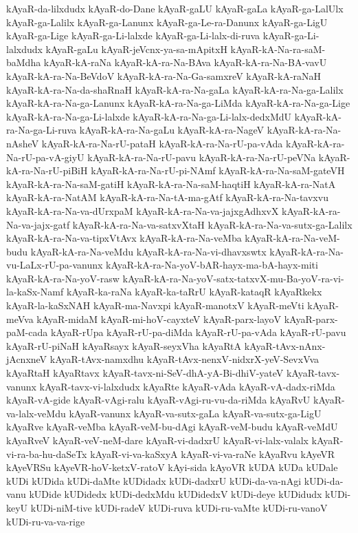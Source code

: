 {kAyaR-da-lilxdudx
kAyaR-do-Dane
kAyaR-gaLU
kAyaR-gaLa
kAyaR-ga-LalUlx
kAyaR-ga-Lalilx
kAyaR-ga-Lanunx
kAyaR-ga-Le-ra-Danunx
kAyaR-ga-LigU
kAyaR-ga-Lige
kAyaR-ga-Li-lalxde
kAyaR-ga-Li-lalx-di-ruva
kAyaR-ga-Li-lalxdudx
kAyaR-gaLu
kAyaR-jeVcnx-ya-sa-mApitxH
kAyaR-kA-Na-ra-saM-baMdha
kAyaR-kA-raNa
kAyaR-kA-ra-Na-BAva
kAyaR-kA-ra-Na-BA-vavU
kAyaR-kA-ra-Na-BeVdoV
kAyaR-kA-ra-Na-Ga-samxreV
kAyaR-kA-raNaH
kAyaR-kA-ra-Na-da-shaRnaH
kAyaR-kA-ra-Na-gaLa
kAyaR-kA-ra-Na-ga-Lalilx
kAyaR-kA-ra-Na-ga-Lanunx
kAyaR-kA-ra-Na-ga-LiMda
kAyaR-kA-ra-Na-ga-Lige
kAyaR-kA-ra-Na-ga-Li-lalxde
kAyaR-kA-ra-Na-ga-Li-lalx-dedxMdU
kAyaR-kA-ra-Na-ga-Li-ruva
kAyaR-kA-ra-Na-gaLu
kAyaR-kA-ra-NageV
kAyaR-kA-ra-Na-nAsheV
kAyaR-kA-ra-Na-rU-pataH
kAyaR-kA-ra-Na-rU-pa-vAda
kAyaR-kA-ra-Na-rU-pa-vA-giyU
kAyaR-kA-ra-Na-rU-pavu
kAyaR-kA-ra-Na-rU-peVNa
kAyaR-kA-ra-Na-rU-piBiH
kAyaR-kA-ra-Na-rU-pi-NAmf
kAyaR-kA-ra-Na-saM-gateVH
kAyaR-kA-ra-Na-saM-gatiH
kAyaR-kA-ra-Na-saM-haqtiH
kAyaR-kA-ra-NatA
kAyaR-kA-ra-NatAM
kAyaR-kA-ra-Na-tA-ma-gAtf
kAyaR-kA-ra-Na-tavxvu
kAyaR-kA-ra-Na-va-dUrxpaM
kAyaR-kA-ra-Na-va-jajxgAdhxvX
kAyaR-kA-ra-Na-va-jajx-gatf
kAyaR-kA-ra-Na-va-satxvXtaH
kAyaR-kA-ra-Na-va-sutx-ga-Lalilx
kAyaR-kA-ra-Na-va-tipxVtAvx
kAyaR-kA-ra-Na-veMba
kAyaR-kA-ra-Na-veM-budu
kAyaR-kA-ra-Na-veMdu
kAyaR-kA-ra-Na-vi-dhavxswtx
kAyaR-kA-ra-Na-vu-LaLx-rU-pa-vanunx
kAyaR-kA-ra-Na-yoV-bAR-hayx-ma-bA-hayx-miti
kAyaR-kA-ra-Na-yoV-rasw
kAyaR-kA-ra-Na-yoV-satx-tatxvX-mu-Ba-yoV-ra-vi-la-kaSx-Namf
kAyaR-ka-raNa
kAyaR-ka-taRrU
kAyaR-kataqR
kAyaRkekx
kAyaR-la-kaSxNAH
kAyaR-ma-Navxpi
kAyaR-manotxV
kAyaR-meVti
kAyaR-meVva
kAyaR-midaM
kAyaR-mi-hoV-cayxteV
kAyaR-parx-layoV
kAyaR-parx-paM-cada
kAyaR-rUpa
kAyaR-rU-pa-diMda
kAyaR-rU-pa-vAda
kAyaR-rU-pavu
kAyaR-rU-piNaH
kAyaRsayx
kAyaR-seyxVha
kAyaRtA
kAyaR-tAvx-nAnx-jAcnxneV
kAyaR-tAvx-namxdhu
kAyaR-tAvx-nenxV-nidxrX-yeV-SevxVva
kAyaRtaH
kAyaRtavx
kAyaR-tavx-ni-SeV-dhA-yA-Bi-dhiV-yateV
kAyaR-tavx-vanunx
kAyaR-tavx-vi-lalxdudx
kAyaRte
kAyaR-vAda
kAyaR-vA-dadx-riMda
kAyaR-vA-gide
kAyaR-vAgi-ralu
kAyaR-vAgi-ru-vu-da-riMda
kAyaRvU
kAyaR-va-lalx-veMdu
kAyaR-vanunx
kAyaR-va-sutx-gaLa
kAyaR-va-sutx-ga-LigU
kAyaRve
kAyaR-veMba
kAyaR-veM-bu-dAgi
kAyaR-veM-budu
kAyaR-veMdU
kAyaRveV
kAyaR-veV-neM-dare
kAyaR-vi-dadxrU
kAyaR-vi-lalx-valalx
kAyaR-vi-ra-ba-hu-daSeTx
kAyaR-vi-va-kaSxyA
kAyaR-vi-va-raNe
kAyaRvu
kAyeVR
kAyeVRSu
kAyeVR-hoV-ketxV-ratoV
kAyi-sida
kAyoVR
kUDA
kUDa
kUDale
kUDi
kUDida
kUDi-daMte
kUDidadx
kUDi-dadxrU
kUDi-da-va-nAgi
kUDi-da-vanu
kUDide
kUDidedx
kUDi-dedxMdu
kUDidedxV
kUDi-deye
kUDidudx
kUDi-keyU
kUDi-niM-tive
kUDi-radeV
kUDi-ruva
kUDi-ru-vaMte
kUDi-ru-vanoV
kUDi-ru-va-va-rige
}
